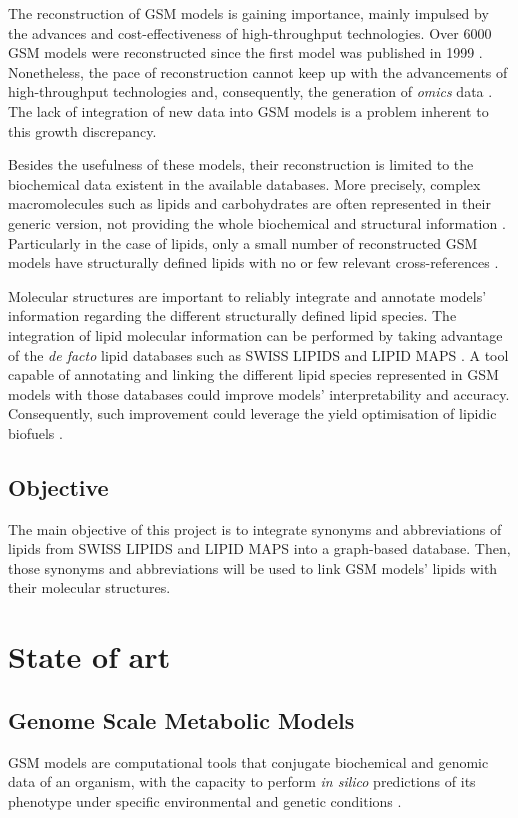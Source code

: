 \documentclass{llncs}
\begin{document}
The reconstruction of GSM models is gaining importance, mainly impulsed by the advances and cost-effectiveness of high-throughput technologies.
Over 6000 GSM models were reconstructed \cite{Gu2019} since the first model was published in 1999 \cite{Edwards1999}.
Nonetheless, the pace of reconstruction cannot keep up with the advancements of high-throughput technologies and, consequently, the generation of \textit{omics} data \cite{Kim2012}. The lack of integration of new data into GSM models is a problem inherent to this growth discrepancy.

Besides the usefulness of these models, their reconstruction is limited to the biochemical data existent in the available databases.
More precisely, complex macromolecules such as lipids and carbohydrates are often represented in their generic version, not providing the whole biochemical and structural information \cite{Gu2019}.
Particularly in the case of lipids, only a small number of reconstructed GSM models have structurally defined lipids with no or few relevant cross-references \cite{Capela}. 

Molecular structures are important to reliably integrate and annotate models' information regarding the different structurally defined lipid species.
The integration of lipid molecular information can be performed by taking advantage of the  \emph{de facto} lipid databases such as SWISS LIPIDS \cite{Aimo2015} and LIPID MAPS \cite{Sud2007}.
A tool capable of annotating and linking the different lipid species represented in GSM models with those databases could improve models' interpretability and accuracy. Consequently, such improvement could leverage the yield optimisation of lipidic biofuels \cite{Sawangkeaw2013}.




\subsection{Objective}

The main objective of this project is to integrate synonyms and abbreviations of lipids from SWISS LIPIDS and LIPID MAPS into a graph-based database. Then, those synonyms and abbreviations will be used to link GSM models' lipids with their molecular structures.

\section{State of art}
\subsection{Genome Scale Metabolic Models}
GSM models are computational tools that conjugate biochemical and genomic data of an organism, with the capacity to perform \emph{in silico} predictions of its phenotype under specific environmental and genetic conditions \cite{Rocha2007,Zhou2021}.
\end{document}
